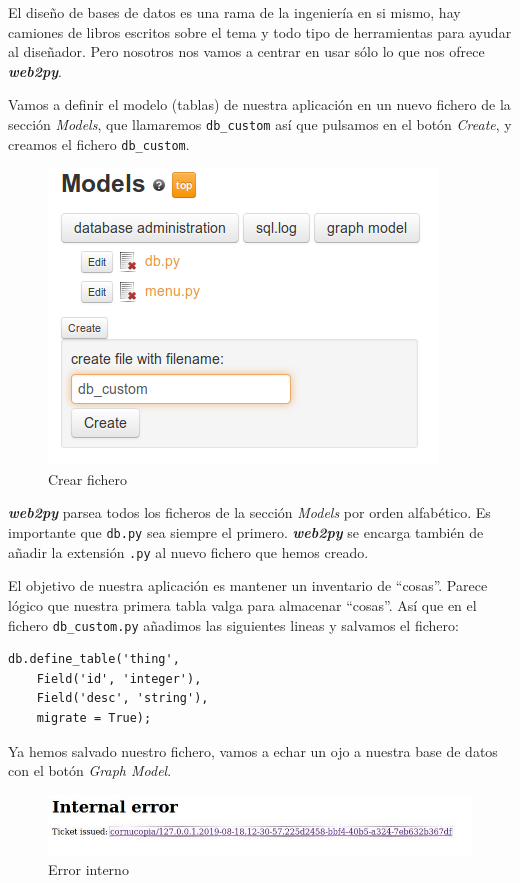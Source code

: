 \documentclass[
  12pt,
  spanish,
]{article}
\begin{document}
El diseño de bases de datos es una rama de la ingeniería en si mismo,
hay camiones de libros escritos sobre el tema y todo tipo de
herramientas para ayudar al diseñador. Pero nosotros nos vamos a centrar
en usar sólo lo que nos ofrece \textbf{\emph{web2py}}.

Vamos a definir el modelo (tablas) de nuestra aplicación en un nuevo
fichero de la sección \emph{Models}, que llamaremos \texttt{db\_custom}
así que pulsamos en el botón \emph{Create}, y creamos el fichero
\texttt{db\_custom}.

\begin{figure}
\centering
\includegraphics{src/img/create_db_custom.png}
\caption{Crear fichero}
\end{figure}

\textbf{\emph{web2py}} parsea todos los ficheros de la sección
\emph{Models} por orden alfabético. Es importante que \texttt{db.py} sea
siempre el primero. \textbf{\emph{web2py}} se encarga también de añadir
la extensión \texttt{.py} al nuevo fichero que hemos creado.

El objetivo de nuestra aplicación es mantener un inventario de
``cosas''. Parece lógico que nuestra primera tabla valga para almacenar
``cosas''. Así que en el fichero \texttt{db\_custom.py} añadimos las
siguientes lineas y salvamos el fichero:

\begin{verbatim}
db.define_table('thing',
    Field('id', 'integer'),
    Field('desc', 'string'),
    migrate = True);
\end{verbatim}

Ya hemos salvado nuestro fichero, vamos a echar un ojo a nuestra base de
datos con el botón \emph{Graph Model}.

\begin{figure}
\centering
\includegraphics{src/img/internal_error.jpg}
\caption{Error interno}
\end{figure}
\end{document}
